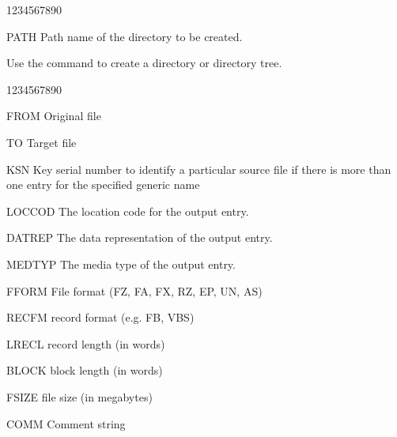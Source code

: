 \begin{DLtt}{1234567890}
\item[PATH]Path name of the directory to be created.
\end{DLtt}
Use the  command to create a directory or directory tree.
\begin{DLtt}{1234567890}
\item[FROM]Original file
\item[TO]Target file
\item[KSN]Key serial number to identify a particular source file if
there is more than one entry for the specified generic name
\item[LOCCOD]The location code for the output entry. 
\item[DATREP]The data representation of the output entry.
\item[MEDTYP]The media type of the output entry.
\item[FFORM]File format (FZ, FA, FX, RZ, EP, UN, AS)
\item[RECFM]record format (e.g. FB, VBS)
\item[LRECL]record length (in words)
\item[BLOCK]block length (in words)
\item[FSIZE]file size (in megabytes)
\item[COMM]Comment string 
\end{DLtt}

